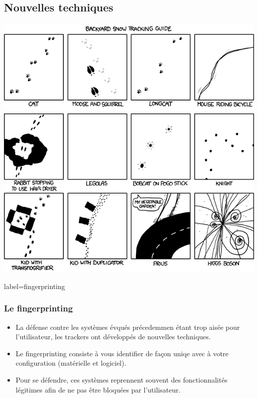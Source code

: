 \documentclass{beamer}
\begin{document}
    \subsection{Nouvelles techniques}
        \begin{frame}
            \begin{center}
                \includegraphics[scale=0.35]{img/snow_tracking.png}
            \end{center}
        \end{frame}
        \begin{frame}{label=fingerprinting}
            \frametitle{Le fingerprinting}
            \begin{center}
                \begin{itemize}
                    \item La défense contre les systèmes évqués précedemmen étant trop aisée pour l'utilisateur, les trackers ont développés de nouvelles techniques.
                    \item Le fingerprinting consiste à vous identifier de façon uniqe avec à votre configuration (matérielle et logiciel).
                    \item Pour se défendre, ces systèmes reprennent souvent des fonctionnalités légitimes afin de ne pas être bloquées par l'utilisateur.
                \end{itemize}
            \end{center}
        \end{frame}
\end{document}
